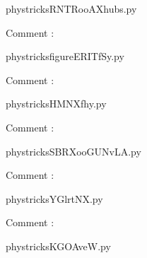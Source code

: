 
    \newcommand{\CaptionFigRNTRooAXhubs}{<+Type your caption here+>}
    \begin{center}
        
    \end{center}
    phystricksRNTRooAXhubs.py

    Comment : 

    \clearpage
    


    \newcommand{\CaptionFigfigureERITfSy}{<+Type your caption here+>}
    \begin{center}
        
    \end{center}
    phystricksfigureERITfSy.py

    Comment : 

    \clearpage
    


    \newcommand{\CaptionFigHMNXfhy}{<+Type your caption here+>}
    \begin{center}
        
    \end{center}
    phystricksHMNXfhy.py

    Comment : 

    \clearpage
    


    \newcommand{\CaptionFigSBRXooGUNvLA}{<+Type your caption here+>}
    \begin{center}
        
    \end{center}
    phystricksSBRXooGUNvLA.py

    Comment : 

    \clearpage
    


    \newcommand{\CaptionFigYGlrtNX}{<+Type your caption here+>}
    \begin{center}
        
    \end{center}
    phystricksYGlrtNX.py

    Comment : 

    \clearpage
    


    \newcommand{\CaptionFigKGOAveW}{<+Type your caption here+>}
    \begin{center}
        
    \end{center}
    phystricksKGOAveW.py

